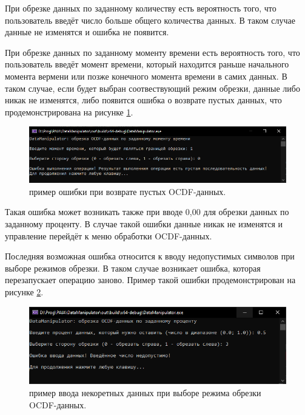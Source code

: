 {  \par При обрезке данных по заданному количеству есть вероятность того, что пользователь введёт число больше общего количества данных. В таком случае данные не изменятся и ошибка не появится. 

  \par При обрезке данных по заданному моменту времени есть вероятность того, что пользователь введёт момент времени, который находится раньше начального момента вермени или позже конечного момента времени в самих данных. В таком случае, если будет выбран соотвествующий режим обрезки, данные либо никак не изменятся, либо появится ошибка о возврате пустых данных, что продемонстрирована на рисунке \ref{fig:ExOCDFdataCatErr3}.

  \begin{figure}[H]
    \centering
    \includegraphics[width=\textwidth]{images/forDataManipulator/ExOCDFdataCatError3.png}
    \caption{пример ошибки при возврате пустых OCDF-данных.} 
    \label{fig:ExOCDFdataCatErr3}
  \end{figure}

  \par Такая ошибка может возникать также при вводе 0,00 для обрезки данных по заданному проценту. В случае такой ошибки данные никак не изменятся и управление перейдёт к меню обработки OCDF-данных.
  
  \par Последняя возможная ошибка относится к вводу недопустимых символов при выборе режимов обрезки. В таком случае возникает ошибка, которая перезапускает операцию заново. Пример такой ошибки продемонстрирован на рисунке \ref{fig:ExOCDFdataCatErr4}.

  \begin{figure}[H]
    \centering
    \includegraphics[width=\textwidth]{images/forDataManipulator/ExOCDFdataCatError4.png}
    \caption{пример ввода некоретных данных при выборе режима обрезки OCDF-данных.} 
    \label{fig:ExOCDFdataCatErr4}
  \end{figure}

  \par
}

